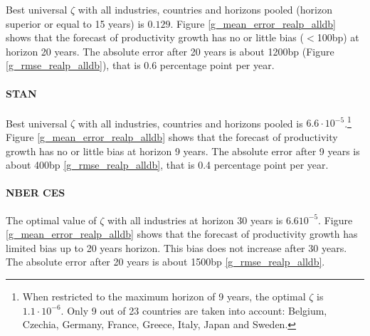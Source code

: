 \documentclass[11pt]{article}
\begin{document}
Best universal $\zeta$ with all industries, countries and horizons pooled (horizon superior or equal to 15 years) is $0.129$.
Figure \ref{g_mean_error_realp_alldb} shows that the forecast of productivity growth has no or little bias ($<$100bp) at horizon 20 years. 
The absolute error after 20 years is about 1200bp (Figure \ref{g_rmse_realp_alldb}), that is 0.6 percentage point per year. 





\paragraph{STAN}


Best universal $\zeta$ with all industries, countries and horizons pooled is $6.6\cdot 10^{-5}$.\footnote{When restricted to the maximum horizon of 9 years, the optimal $\zeta$ is $1.1\cdot 10^{-6}$. Only 9 out of 23 countries are taken into account: Belgium, Czechia, Germany, France, Greece, Italy, Japan and Sweden.} 
Figure \ref{g_mean_error_realp_alldb} shows that the forecast of productivity growth has no or little bias at horizon 9 years. 
 The absolute error after 9 years is about 400bp \ref{g_rmse_realp_alldb}, that is 0.4 percentage point per year. 



\paragraph{NBER CES}


The optimal value of $\zeta$ with all industries at horizon 30 years is 6.6$10^{-5}$.
Figure \ref{g_mean_error_realp_alldb} shows that the forecast of productivity growth has limited bias up to 20 years horizon. This bias does not increase after 30 years. The absolute error after 20 years is about 1500bp \ref{g_rmse_realp_alldb}.
\end{document}
